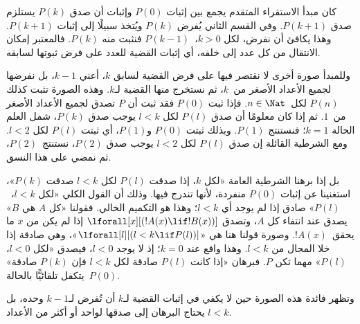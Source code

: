 \documentclass[../../../include/open-logic-section]{subfiles}
\begin{document}


كان مبدأ الاستقراء المتقدم يجمع بين إثبات $P(0)$ وإثبات أن صدق
$P(k)$ يستلزم صدق $P(k+1)$. وفي القسم الثاني يُفرض $P(k)$ ويُتخذ
سبيلًا إلى إثبات $P(k+1)$. وهذا يكافئ أن نفرض، لكل $k>0$،~$P(k-1)$
فنثبت منه $P(k)$. فالمعتبر إمكان الانتقال من كل عدد إلى خلفه، أي
إثبات القضية للعدد على فرض ثبوتها لسابقه.

وللمبدأ صورة أخرى لا نقتصر فيها على فرض القضية لسابق $k$، أعني
$k-1$، بل نفرضها لجميع الأعداد الأصغر من~$k$، ثم نستخرج منها القضية
لـ$k$. وهذه الصورة تثبت كذلك $P(n)$ لكل~$n \in \Nat$. فإذا ثبت
$P(0)$ فقد ثبت أن $P$ تصدق لجميع الأعداد الأصغر من~$1$. ثم إذا كان
معلومًا أن صدق $P(l)$ لكل $l<k$ يوجب صدق $P(k)$، شمل العلم الحالة
$k=1$؛ فنستنتج $P(1)$. وبذلك ثبتت $P(0)$ و$P(1)$، أي ثبتت
$P(l)$ لكل $l<2$. ومع الشرطية القائلة إن صدق $P(l)$ لكل $l<2$ يوجب
صدق $P(2)$، نستنتج~$P(2)$، ثم نمضي على هذا النسق.

بل إذا برهنا الشرطية العامة «لكل $k$، إذا صدقت $P(l)$ لكل $l<k$
صدقت $P(k)$»، استغنينا عن إثبات $P(0)$ منفردة، لأنها تندرج فيها.
وذلك أن القول الكلي «لكل $l<k$،~$P(l)$» صادق إذا لم يوجد أي $l<k$؛
وهذا هو التكميم الخالي. فقولنا «كل $A$ هي $B$» يصدق عند انتفاء كل
$A$، وتصدق $\lforall[x][(!A(x) \lif !B(x))]$ إذا لم يكن من $x$ ما
يحقق~$!A(x)$. وصورة قولنا هنا هي
«$\lforall[l][(l < k \lif P(l))]$»، وهي صادقة إذا خلا المجال من
$l < k$. وهذا واقع عند $k=0$؛ إذ لا يوجد $l<0$، فيصدق «لكل $l<0$،
$P(l)$» مهما تكن $P$. فبرهان «إذا كانت $P(l)$ صادقة لكل $l<k$ فإن
$P(k)$ صادقة» يتكفل تلقائيًّا بالحالة~$P(0)$.

وتظهر فائدة هذه الصورة حين لا يكفي في إثبات القضية لـ$k$ أن تُفرض
لـ$k-1$ وحده، بل يحتاج البرهان إلى صدقها لواحد أو أكثر من الأعداد
$l<k$.
\end{document}
